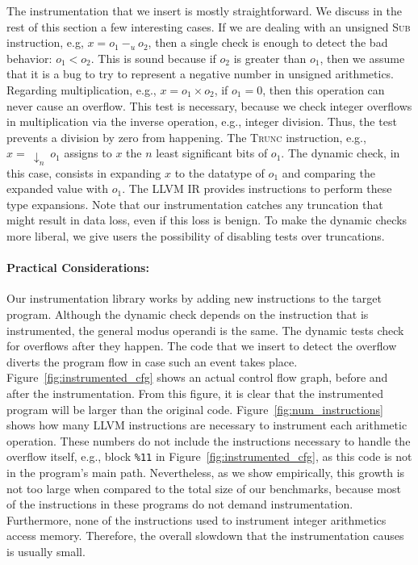 \documentclass[preprint]{sigplanconf}[10pt]
\begin{document}
The instrumentation that we insert is mostly straightforward.
We discuss in the rest of this section a few interesting cases.
If we are dealing with an unsigned \textsc{Sub} instruction, e.g,
$x = o_1 \ -_u \ o_2$, then a single check is enough to detect the bad
behavior: $o_1 < o_2$.
This is sound because if $o_2$ is greater than $o_1$, then we assume that it is
a bug to try to represent a negative number in unsigned arithmetics.
Regarding multiplication, e.g., $x = o_1 \times o_2$, if $o_1 = 0$, then this
operation can never cause an overflow.
This test is necessary, because we check integer overflows in
multiplication via the inverse operation, e.g., integer division.
Thus, the test prevents a division by zero from happening.
The \textsc{Trunc} instruction, e.g., $x = \ \downarrow_n \ o_1$ assigns to $x$
the $n$ least significant bits of $o_1$.
The dynamic check, in this case, consists in expanding $x$ to
the datatype of $o_1$ and comparing the expanded value with $o_1$.
The LLVM IR provides instructions to perform these type expansions.
Note that our instrumentation catches any truncation that might result in
data loss, even if this loss is benign.
To make the dynamic checks more liberal, we give users the possibility of
disabling tests over truncations.

\paragraph{Practical Considerations: }
Our instrumentation library works by adding new instructions to
the target program.
Although the dynamic check depends on the instruction that is instrumented,
the general modus operandi is the same.
The dynamic tests check for overflows after they happen.
The code that we insert to detect the overflow diverts the program flow in case
such an event takes place.
Figure~\ref{fig:instrumented_cfg} shows an actual control flow graph, before
and after the instrumentation.
From this figure, it is clear that the instrumented program will be larger
than the original code.
Figure~\ref{fig:num_instructions} shows how many LLVM instructions are
necessary to instrument each arithmetic operation.
These numbers do not include the instructions necessary to handle the overflow
itself, e.g., block \texttt{\%11} in Figure~\ref{fig:instrumented_cfg}, as this
code is not in the program's main path.
Nevertheless, as we show empirically, this growth is not too large when
compared to the total size of our benchmarks, because most of the instructions
in these programs do not demand instrumentation.
Furthermore, none of the instructions used to instrument integer arithmetics
access memory.
Therefore, the overall slowdown that the instrumentation causes is usually
small.
\end{document}
